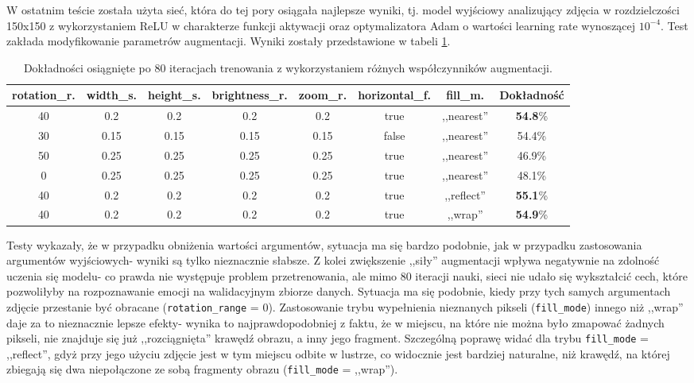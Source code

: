 W ostatnim teście została użyta sieć, która do tej pory osiągała najlepsze wyniki, tj. model wyjściowy analizujący zdjęcia w rozdzielczości 150x150 z wykorzystaniem ReLU w charakterze funkcji aktywacji oraz optymalizatora Adam o wartości learning rate wynoszącej $10^{-4}$. Test zakłada modyfikowanie parametrów augmentacji. Wyniki zostały przedstawione w tabeli \ref{tab:5.9}.

\begin{table}[H]
  \centering
  \caption{Dokładności osiągnięte po 80 iteracjach trenowania z wykorzystaniem różnych współczynników augmentacji.}
    \begin{tabular}{ |c|c|c|c|c|c|c|c| }
    \hline
    rotation\_r. & width\_s. & height\_s. & brightness\_r. & zoom\_r. & horizontal\_f. & fill\_m. & Dokładność \\
    \hline
    40 & 0.2 & 0.2 & 0.2 & 0.2 & true & ,,nearest'' & \textbf{54.8}\% \\
    30 & 0.15 & 0.15 & 0.15 & 0.15 & false & ,,nearest'' & 54.4\% \\
    50 & 0.25 & 0.25 & 0.25 & 0.25 & true & ,,nearest'' & 46.9\% \\
    0 & 0.25 & 0.25 & 0.25 & 0.25 & true & ,,nearest'' & 48.1\% \\
    40 & 0.2 & 0.2 & 0.2 & 0.2 & true & ,,reflect'' & \textbf{55.1}\% \\
    40 & 0.2 & 0.2 & 0.2 & 0.2 & true & ,,wrap'' & \textbf{54.9}\% \\
    \hline
    \end{tabular}
  \label{tab:5.9}
\end{table}

Testy wykazały, że w przypadku obniżenia wartości argumentów, sytuacja ma się bardzo podobnie, jak w przypadku zastosowania argumentów wyjściowych- wyniki są tylko nieznacznie słabsze. Z kolei zwiększenie ,,siły'' augmentacji wpływa negatywnie na zdolność uczenia się modelu- co prawda nie występuje problem przetrenowania, ale mimo 80 iteracji nauki, sieci nie udało się wykształcić cech, które pozwoliłyby na rozpoznawanie emocji na walidacyjnym zbiorze danych. Sytuacja ma się podobnie, kiedy przy tych samych argumentach zdjęcie przestanie być obracane (\verb|rotation_range| = 0). Zastosowanie trybu wypełnienia nieznanych pikseli (\verb|fill_mode|) innego niż ,,wrap'' daje za to nieznacznie lepsze efekty- wynika to najprawdopodobniej z faktu, że w miejscu, na które nie można było zmapować żadnych pikseli, nie znajduje się już ,,rozciągnięta'' krawędź obrazu, a inny jego fragment. Szczególną poprawę widać dla trybu \verb|fill_mode| = ,,reflect'', gdyż przy jego użyciu zdjęcie jest w tym miejscu odbite w lustrze, co widocznie jest bardziej naturalne, niż krawędź, na której zbiegają się dwa niepołączone ze sobą fragmenty obrazu (\verb|fill_mode| = ,,wrap'').

